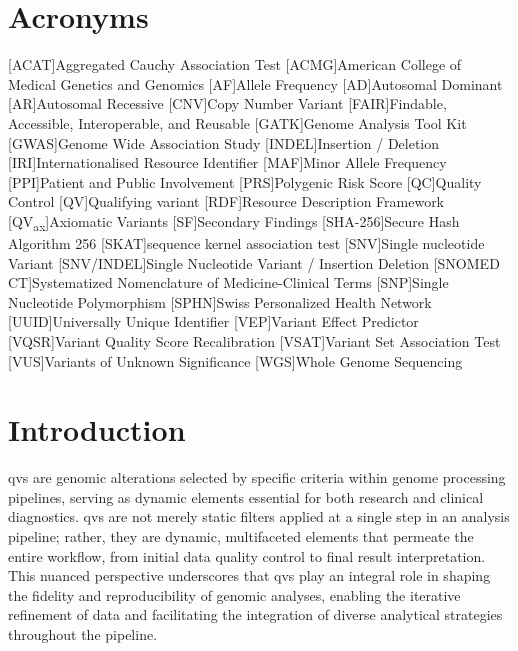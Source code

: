 \section*{Acronyms}
\renewenvironment{description} %
{\list{}{\labelwidth0pt\itemindent-\leftmargin
    \parsep-1em\itemsep0pt\let\makelabel\descriptionlabel}}
               {\endlist}
\begin{acronym} 
 [ACAT]{Aggregated Cauchy Association Test }
 [ACMG]{American College of Medical Genetics and Genomics}
 [AF]{Allele Frequency}
 [AD]{Autosomal Dominant}
 [AR]{Autosomal Recessive}
  [CNV]{Copy Number Variant}
 [FAIR]{Findable, Accessible, Interoperable, and Reusable}
 [GATK]{Genome Analysis Tool Kit}
 [GWAS]{Genome Wide Association Study}
 [INDEL]{Insertion / Deletion}
 [IRI]{Internationalised Resource Identifier}
 [MAF]{Minor Allele Frequency}
 [PPI]{Patient and Public Involvement}
 [PRS]{Polygenic Risk Score} 
 [QC]{Quality Control}
 [QV]{Qualifying variant}
 [RDF]{Resource Description Framework}
 [QV\textsubscript{ax}]{Axiomatic Variants}
 [SF]{Secondary Findings}
 [SHA-256]{Secure Hash Algorithm 256}
 [SKAT]{sequence kernel association test} 
 [SNV]{Single nucleotide Variant}
  [SNV/INDEL]{Single Nucleotide Variant / Insertion Deletion}
  [SNOMED CT]{Systematized Nomenclature of Medicine-Clinical Terms}
 [SNP]{Single Nucleotide Polymorphism}
 [SPHN]{Swiss Personalized Health Network}
 [UUID]{Universally Unique Identifier}
  [VEP]{Variant Effect Predictor}
 [VQSR]{Variant Quality Score Recalibration}
 [VSAT]{Variant Set Association Test}
 [VUS]{Variants of Unknown Significance}
 [WGS]{Whole Genome Sequencing}
\end{acronym}

\clearpage

\section{Introduction}
\label{sec:intro}

\ac{qv}s are genomic alterations selected by specific criteria within genome processing pipelines, serving as dynamic elements essential for both research and clinical diagnostics. 
\ac{qv}s are not merely static filters applied at a single step in an analysis pipeline; rather, they are dynamic, multifaceted elements that permeate the entire workflow, from initial data quality control to final result interpretation. This nuanced perspective underscores that \ac{qv}s play an integral role in shaping the fidelity and reproducibility of genomic analyses, enabling the iterative refinement of data and facilitating the integration of diverse analytical strategies throughout the pipeline.

